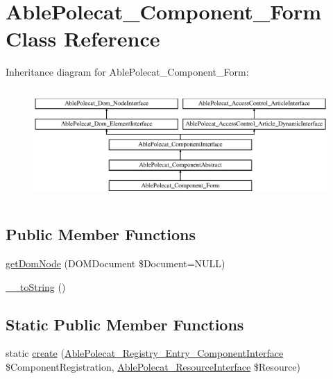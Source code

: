 \hypertarget{class_able_polecat___component___form}{}\section{Able\+Polecat\+\_\+\+Component\+\_\+\+Form Class Reference}
\label{class_able_polecat___component___form}
Inheritance diagram for Able\+Polecat\+\_\+\+Component\+\_\+\+Form\+:\begin{figure}[H]
\begin{center}
\leavevmode
\includegraphics[height=4.268293cm]{class_able_polecat___component___form}
\end{center}
\end{figure}
\subsection*{Public Member Functions}
\begin{DoxyCompactItemize}
\item 
\hyperlink{class_able_polecat___component___form_a3241c66cb1cbb7b720be191808876012}{get\+Dom\+Node} (D\+O\+M\+Document \$Document=N\+U\+L\+L)
\item 
\hyperlink{class_able_polecat___component___form_a7516ca30af0db3cdbf9a7739b48ce91d}{\+\_\+\+\_\+to\+String} ()
\end{DoxyCompactItemize}
\subsection*{Static Public Member Functions}
\begin{DoxyCompactItemize}
\item 
static \hyperlink{class_able_polecat___component___form_a9b5ffdd8a1445d0295c494b3277b313e}{create} (\hyperlink{interface_able_polecat___registry___entry___component_interface}{Able\+Polecat\+\_\+\+Registry\+\_\+\+Entry\+\_\+\+Component\+Interface} \$Component\+Registration, \hyperlink{interface_able_polecat___resource_interface}{Able\+Polecat\+\_\+\+Resource\+Interface} \$Resource)
\end{DoxyCompactItemize}
